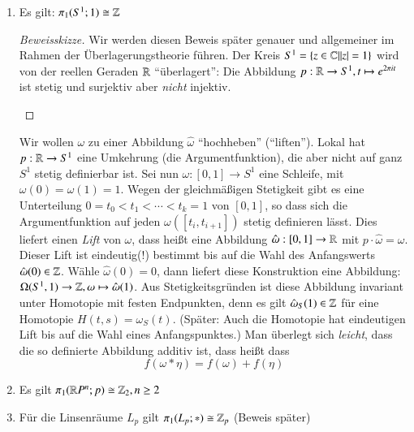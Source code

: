 \documentclass[a4paper,10pt]{scrartcl}
\newcommand{\homo}{\cong}
\begin{document}
\begin{exs*}
\begin{enumerate}[(1)]
\item Es gilt: $\pi_1(S^1; 1)\homo \Z$
\begin{proof}[Beweisskizze]
Wir werden diesen Beweis später genauer und allgemeiner im Rahmen der Überlagerungstheorie führen. Der Kreis $S^1=\{ z\in \mathbb{C}| |z|=1\}$ wird von der reellen Geraden $\mathbb{R}$ "`überlagert"': Die Abbildung $p:  \mathbb{R}\to S^1, t\mapsto e^{2\pi i t}$ ist stetig und surjektiv aber \emph{nicht} injektiv.\\
\begin{figure}[ht]
\centering

\caption{}
\end{figure}
\end{proof}
Wir wollen $\omega$ zu einer Abbildung $\hat\omega$ "`hochheben"' ("`liften"'). Lokal hat $p: \mathbb{R}  \to S^1$ eine Umkehrung (die Argumentfunktion), die aber nicht auf ganz $S^1$ stetig definierbar ist. Sei nun $\omega: [0,1]\to S^1$ eine Schleife, mit $\omega(0)=\omega(1)=1$. Wegen der gleichmäßigen Stetigkeit gibt es eine Unterteilung $0=t_0<t_1<\dotsb <t_k=1$ von $[0,1]$, so dass sich  die Argumentfunktion auf jeden $\omega([t_i, t_{i+1}])$ stetig definieren lässt. Dies liefert einen \emph{Lift} von $\omega$, dass heißt eine Abbildung $\hat \omega: [0,1]\to \mathbb{R}$ mit $p \cdot \hat \omega=\omega$. Dieser Lift ist eindeutig(!) bestimmt bis auf die Wahl des Anfangswerts $\hat \omega(0) \in \mathbb{Z}$. Wähle $\hat \omega(0)=0$, dann liefert diese Konstruktion eine Abbildung: $\Omega(S^1, 1)\to \mathbb{Z}, \omega \mapsto \hat \omega(1)$. Aus Stetigkeitsgründen ist diese Abbildung invariant unter Homotopie mit festen Endpunkten, denn es gilt $\hat \omega_S(1)\in \mathbb{Z}$ für eine Homotopie $H(t,s)=\omega_S(t)$. (Später: Auch die Homotopie hat eindeutigen Lift bis auf die Wahl eines Anfangspunktes.) Man überlegt sich \emph{leicht}, dass die so definierte Abbildung additiv ist, dass heißt dass
\[
 f(\omega*\eta)=f(\omega)+f(\eta)
\]
\item Es gilt $\pi_1(\R P^n; p)\homo \Z_2, n\ge 2$
 \begin{table}[h]
 \end{table}
\item Für die Linsenräume $L_p$ gilt $\pi_1(L_p;*)\homo \Z_p$ (Beweis später)


\end{enumerate}
\end{exs*}
\end{document}
